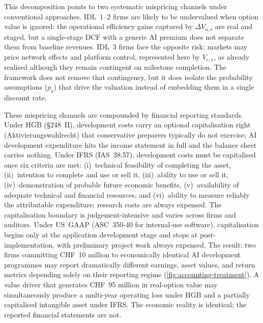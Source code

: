 \documentclass[oneside,10pt]{swissi}
\begin{document}
This decomposition points to two systematic mispricing channels under conventional approaches. IDL~1--2 firms are likely to be undervalued when option value is ignored: the operational efficiency gains captured by $\Delta V_{\mathrm{o},s}$ are real and staged, but a single-stage DCF with a generic AI premium does not separate them from baseline revenues. IDL~3 firms face the opposite risk: markets may price network effects and platform control, represented here by $V_{\mathrm{c},s}$, as already realised although they remain contingent on milestone completion. The framework does not remove that contingency, but it does isolate the probability assumptions ($p_s$) that drive the valuation instead of embedding them in a single discount rate.

These mispricing channels are compounded by financial reporting standards. Under HGB (§248~II), development costs carry an optional capitalisation right (Aktivierungswahlrecht) that conservative preparers typically do not exercise; AI development expenditure hits the income statement in full and the balance sheet carries nothing. Under IFRS (IAS~38.57), development costs must be capitalised once six criteria are met: (i)~technical feasibility of completing the asset, (ii)~intention to complete and use or sell it, (iii)~ability to use or sell it, (iv)~demonstration of probable future economic benefits, (v)~availability of adequate technical and financial resources, and (vi)~ability to measure reliably the attributable expenditure; research costs are always expensed. The capitalisation boundary is judgement-intensive and varies across firms and auditors. Under US~GAAP (ASC~350-40 for internal-use software), capitalisation begins only at the application development stage and stops at post-implementation, with preliminary project work always expensed. The result: two firms committing CHF~10 million to economically identical AI development programmes may report dramatically different earnings, asset values, and return metrics depending solely on their reporting regime (\cref{fig:accounting-treatment}). A value driver that generates CHF~95 million in real-option value may simultaneously produce a multi-year operating loss under HGB and a partially capitalised intangible asset under IFRS. The economic reality is identical; the reported financial statements are not.
\end{document}
